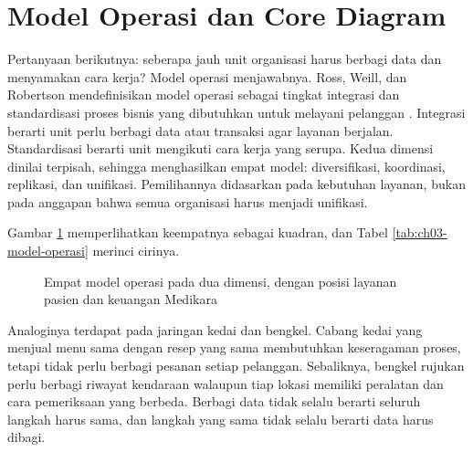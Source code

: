 \section{Model Operasi dan Core Diagram}

Pertanyaan berikutnya: seberapa jauh unit organisasi harus berbagi data dan
menyamakan cara kerja? Model operasi menjawabnya. Ross, Weill, dan Robertson
mendefinisikan model operasi sebagai tingkat integrasi dan standardisasi proses
bisnis yang dibutuhkan untuk melayani pelanggan \cite{ross2006}. Integrasi berarti
unit perlu berbagi data atau transaksi agar layanan berjalan. Standardisasi
berarti unit mengikuti cara kerja yang serupa. Kedua dimensi dinilai terpisah,
sehingga menghasilkan empat model: diversifikasi, koordinasi, replikasi, dan
unifikasi. Pemilihannya didasarkan pada kebutuhan layanan, bukan pada anggapan
bahwa semua organisasi harus menjadi unifikasi.

Gambar \ref{fig:ch03-model-operasi} memperlihatkan keempatnya sebagai kuadran, dan
Tabel \ref{tab:ch03-model-operasi} merinci cirinya.

\begin{figure}[!htb]
  \centering
  
  \caption{Empat model operasi pada dua dimensi, dengan posisi layanan pasien dan
           keuangan Medikara}
  \label{fig:ch03-model-operasi}
\end{figure}

Analoginya terdapat pada jaringan kedai dan bengkel. Cabang kedai yang menjual
menu sama dengan resep yang sama membutuhkan keseragaman proses, tetapi tidak
perlu berbagi pesanan setiap pelanggan. Sebaliknya, bengkel rujukan perlu berbagi
riwayat kendaraan walaupun tiap lokasi memiliki peralatan dan cara pemeriksaan
yang berbeda. Berbagi data tidak selalu berarti seluruh langkah harus sama, dan
langkah yang sama tidak selalu berarti data harus dibagi.

